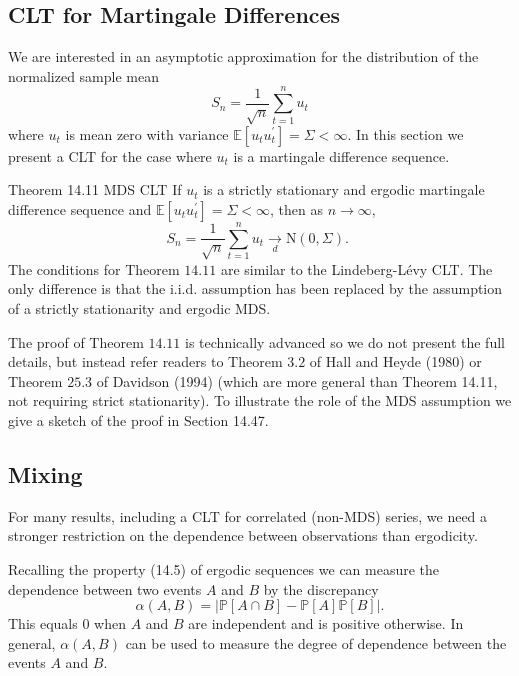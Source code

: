 \documentclass[10pt]{article}
\begin{document}
\subsection{CLT for Martingale Differences}
We are interested in an asymptotic approximation for the distribution of the normalized sample mean
$$
S_{n}=\frac{1}{\sqrt{n}} \sum_{t=1}^{n} u_{t}
$$
where $u_{t}$ is mean zero with variance $\mathbb{E}\left[u_{t} u_{t}^{\prime}\right]=\Sigma<\infty$. In this section we present a CLT for the case where $u_{t}$ is a martingale difference sequence.

Theorem 14.11 MDS CLT If $u_{t}$ is a strictly stationary and ergodic martingale difference sequence and $\mathbb{E}\left[u_{t} u_{t}^{\prime}\right]=\Sigma<\infty$, then as $n \rightarrow \infty$,
$$
S_{n}=\frac{1}{\sqrt{n}} \sum_{t=1}^{n} u_{t} \underset{d}{\longrightarrow} \mathrm{N}(0, \Sigma) \text {. }
$$
The conditions for Theorem $14.11$ are similar to the Lindeberg-Lévy CLT. The only difference is that the i.i.d. assumption has been replaced by the assumption of a strictly stationarity and ergodic MDS.

The proof of Theorem $14.11$ is technically advanced so we do not present the full details, but instead refer readers to Theorem $3.2$ of Hall and Heyde (1980) or Theorem $25.3$ of Davidson (1994) (which are more general than Theorem 14.11, not requiring strict stationarity). To illustrate the role of the MDS assumption we give a sketch of the proof in Section 14.47.

\subsection{Mixing}
For many results, including a CLT for correlated (non-MDS) series, we need a stronger restriction on the dependence between observations than ergodicity.

Recalling the property (14.5) of ergodic sequences we can measure the dependence between two events $A$ and $B$ by the discrepancy
$$
\alpha(A, B)=|\mathbb{P}[A \cap B]-\mathbb{P}[A] \mathbb{P}[B]| .
$$
This equals 0 when $A$ and $B$ are independent and is positive otherwise. In general, $\alpha(A, B)$ can be used to measure the degree of dependence between the events $A$ and $B$.
\end{document}
